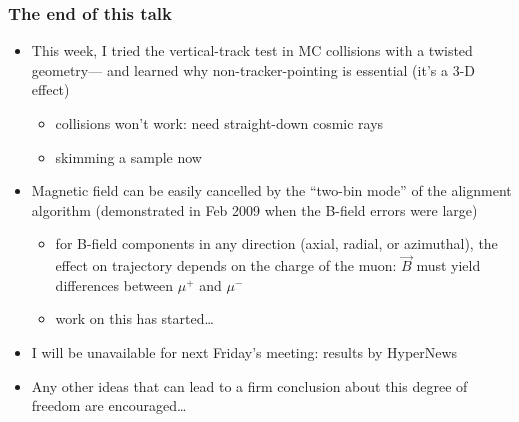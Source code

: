 \documentclass[compress]{beamer}
\begin{document}


\begin{frame}
\frametitle{The end of this talk}
\begin{itemize}
\item This week, I tried the vertical-track test in MC collisions with
  a twisted geometry--- and learned why non-tracker-pointing is
  essential (it's a 3-D effect)
\begin{itemize}
\item collisions won't work: need straight-down cosmic rays
\item skimming a sample now
\end{itemize}

\item Magnetic field can be easily cancelled by the ``two-bin mode''
  of the alignment algorithm (demonstrated in Feb 2009 when the
  B-field errors were large)
\begin{itemize}
\item for B-field components in any direction (axial, radial, or
  azimuthal), the effect on trajectory depends on the charge of the
  muon: $\vec{B}$ must yield differences between $\mu^+$ and $\mu^-$
\item work on this has started\ldots
\end{itemize}

\item I will be unavailable for next Friday's meeting: results by HyperNews

\item Any other ideas that can lead to a firm conclusion about this
  degree of freedom are encouraged\ldots
\end{itemize}
\label{numpages}
\end{frame}
\end{document}

